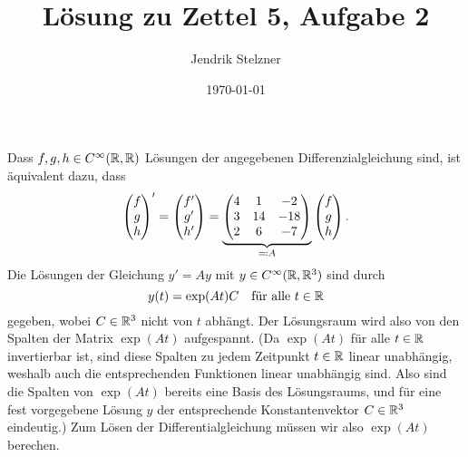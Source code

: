\documentclass[a4paper, 10pt]{scrartcl}
\title{Lösung zu Zettel 5, Aufgabe 2}
\author{Jendrik Stelzner}
\date{\today}
\begin{document}
\maketitle


Dass $f,g,h \in C^\infty(\mathbb{R}, \mathbb{R})$ Lösungen der angegebenen Differenzialgleichung sind, ist äquivalent dazu, dass
\[
    \begin{pmatrix} f \\ g \\ h \end{pmatrix}'
  = \begin{pmatrix} f' \\ g' \\ h' \end{pmatrix}
  =
  \underbrace{
  \begin{pmatrix}
    4 &  1  &  -2 \\
    3 & 14  & -18 \\
    2 &  6  &  -7
  \end{pmatrix}
  }_{\eqqcolon A}
  \begin{pmatrix} f \\ g \\ h \end{pmatrix}.
\]
Die Lösungen der Gleichung $y' = A y$ mit $y \in C^\infty(\mathbb{R}, \mathbb{R}^3)$ sind durch
\[
  y(t) = \exp(At) C
  \quad
  \text{für alle $t \in \mathbb{R}$}
\]
gegeben, wobei $C \in \mathbb{R}^3$ nicht von $t$ abhängt.
Der Lösungsraum wird also von den Spalten der Matrix $\exp(At)$ aufgespannt.
(Da $\exp(At)$ für alle $t \in \mathbb{R}$ invertierbar ist, sind diese Spalten zu jedem Zeitpunkt $t \in \mathbb{R}$ linear unabhängig, weshalb auch die entsprechenden Funktionen linear unabhängig sind.
Also sind die Spalten von $\exp(At)$ bereits eine Basis des Lösungsraums, und für eine fest vorgegebene Lösung $y$ der entsprechende Konstantenvektor $C \in \mathbb{R}^3$ eindeutig.)
Zum Lösen der Differentialgleichung müssen wir also $\exp(At)$ berechen.
\end{document}
